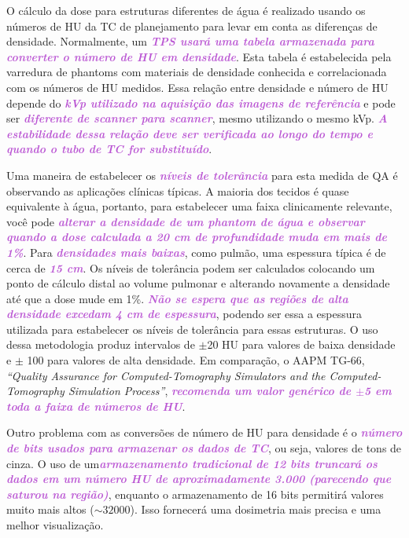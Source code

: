 \documentclass[11pt,a4paper]{article}
\begin{document}
	O cálculo da dose para estruturas diferentes de água é realizado usando os números de HU da TC de planejamento para levar em conta as diferenças de densidade. Normalmente, um \textcolor{MediumOrchid}{\textbf{\textit{TPS usará uma tabela armazenada para converter o número de HU em densidade}}}. Esta tabela é estabelecida pela varredura de phantoms com materiais de densidade conhecida e correlacionada com os números de HU medidos. Essa relação entre densidade e número de HU depende do \textcolor{MediumOrchid}{\textbf{\textit{kVp utilizado na aquisição das imagens de referência}}} e pode ser \textcolor{MediumOrchid}{\textbf{\textit{diferente de scanner para scanner}}}, mesmo utilizando o mesmo kVp. \textcolor{MediumOrchid}{\textbf{\textit{A estabilidade dessa relação deve ser verificada ao longo do tempo e quando o tubo de TC for substituído}}}.

	Uma maneira de estabelecer os \textcolor{MediumOrchid}{\textbf{\textit{níveis de tolerância}}} para esta medida de QA é observando as aplicações clínicas típicas. A maioria dos tecidos é quase equivalente à água, portanto, para estabelecer uma faixa clinicamente relevante, você pode \textcolor{MediumOrchid}{\textbf{\textit{alterar a densidade de um phantom de água e observar quando a dose calculada a 20 cm de profundidade muda em mais de 1\%}}}. Para \textcolor{MediumOrchid}{\textbf{\textit{densidades mais baixas}}}, como pulmão, uma espessura típica é de cerca de \textcolor{MediumOrchid}{\textbf{\textit{15 cm}}}. Os níveis de tolerância podem ser calculados colocando um ponto de cálculo distal ao volume pulmonar e alterando novamente a densidade até que a dose mude em 1\%. \textcolor{MediumOrchid}{\textbf{\textit{Não se espera que as regiões de alta densidade excedam 4 cm de espessura}}}, podendo ser essa a espessura utilizada para estabelecer os níveis de tolerância para essas estruturas. O uso dessa metodologia produz intervalos de $\pm$20 HU para valores de baixa densidade e $\pm$ 100 para valores de alta densidade. Em comparação, o AAPM TG-66, \textit{``Quality Assurance for Computed-Tomography Simulators and the Computed-Tomography Simulation Process''}, \textcolor{MediumOrchid}{\textbf{\textit{recomenda um valor genérico de $\pm$5 em toda a faixa de números de HU}}}.

	Outro problema com as conversões de número de HU para densidade é o \textcolor{MediumOrchid}{\textbf{\textit{número de bits usados para armazenar os dados de TC}}}, ou seja, valores de tons de cinza. O uso de um\textcolor{MediumOrchid}{\textbf{\textit{armazenamento tradicional de 12 bits truncará os dados em um número HU de aproximadamente 3.000 (parecendo que saturou na região)}}}, enquanto o armazenamento de 16 bits permitirá valores muito mais altos ($\sim 32000$). Isso fornecerá uma dosimetria mais precisa e uma melhor visualização.
\end{document}
